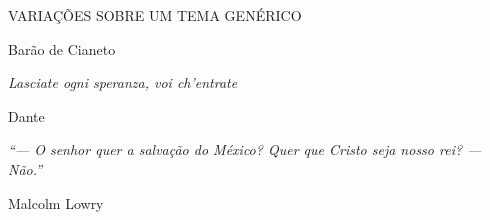 %
%
{
	\centering
	\thispagestyle{empty} %
	
	\vspace*{0.35\textheight} %
	
	{
	\huge
	\selectfont	
	\uppercase{
		Variações sobre um tema genérico
	}
	}

	\vspace*{0.3\textheight}	

	{
	\LARGE
	\selectfont
	Barão de Cianeto
	
	}
}
\newpage

%
%
{
	\thispagestyle{empty}

	\vspace*{0.5\textheight}
	\raggedleft
	\textit{
	\Large
	Lasciate ogni speranza, voi ch'entrate
	}
	
	\vspace*{12pt}
	\Large
	Dante


	\vspace*{12pt}

	\setlength\epigraphrule{1pt}
	\setlength{}
	\renewcommand{\epigraphflush}{flushright}
	\epigraph{
	\textit{
	\Large
	``--- O senhor quer a salvação do México? Quer que Cristo seja nosso rei?
	--- Não.''
	} 
	} {
	\Large
	Malcolm Lowry
	}

}
\newpage

